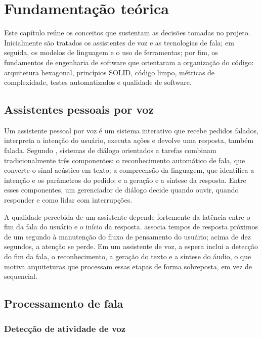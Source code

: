 \chapter{Fundamentação teórica}

Este capítulo reúne os conceitos que sustentam as decisões tomadas no projeto. Inicialmente são
tratados os assistentes de voz e as tecnologias de fala; em seguida, os modelos de linguagem e o uso
de ferramentas; por fim, os fundamentos de engenharia de software que orientaram a organização do
código: arquitetura hexagonal, princípios SOLID, código limpo, métricas de complexidade, testes
automatizados e qualidade de software.

\section{Assistentes pessoais por voz}

Um assistente pessoal por voz é um sistema interativo que recebe pedidos falados, interpreta a
intenção do usuário, executa ações e devolve uma resposta, também falada. Segundo
\textcite{jurafsky2009}, sistemas de diálogo orientados a tarefas combinam tradicionalmente três
componentes: o reconhecimento automático de fala, que converte o sinal acústico em texto; a
compreensão da linguagem, que identifica a intenção e os parâmetros do pedido; e a geração e a síntese
da resposta. Entre esses componentes, um gerenciador de diálogo decide quando ouvir, quando responder
e como lidar com interrupções.

A qualidade percebida de um assistente depende fortemente da latência entre o fim da fala do usuário
e o início da resposta. \textcite{nielsen1993} associa tempos de resposta próximos de um segundo à
manutenção do fluxo de pensamento do usuário; acima de dez segundos, a atenção se perde. Em um
assistente de voz, a espera inclui a detecção do fim da fala, o reconhecimento, a geração do texto e
a síntese do áudio, o que motiva arquiteturas que processam essas etapas de forma sobreposta, em vez
de sequencial.

\section{Processamento de fala}

\subsection{Detecção de atividade de voz}

